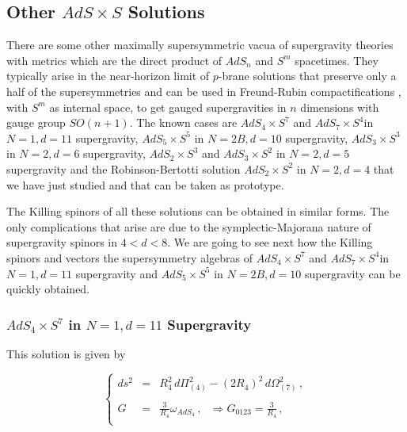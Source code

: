 \documentclass[12pt,a4paper]{article}
\begin{document}
\subsection{Other $AdS\times S$ Solutions}
\label{sec-AdSxS}

There are some other maximally supersymmetric vacua of supergravity
theories with metrics which are the direct product of $AdS_{n}$ and
$S^{m}$ spacetimes. They typically arise in the near-horizon limit of
$p$-brane solutions that preserve only a half of the supersymmetries
\cite{Gibbons:sv} and can be used in Freund-Rubin compactifications
\cite{Freund:1980xh}, with $S^{m}$ as internal space, to get gauged
supergravities in $n$ dimensions with gauge group $SO(n+1)$. The known
cases are $AdS_{4}\times S^{7}$ and $AdS_{7}\times S^{4}$in $N=1,d=11$
supergravity, $AdS_{5}\times S^{5}$ in $N=2B,d=10$ supergravity,
$AdS_{3}\times S^{3}$ in $N=2,d=6$ supergravity, $AdS_{2}\times S^{3}$
\cite{Chamseddine:1996pi} and $AdS_{3}\times S^{2}$
\cite{Gibbons:1994vm} in $N=2,d=5$ supergravity and the
Robinson-Bertotti solution $AdS_{2}\times S^{2}$ in $N=2,d=4$ that we
have just studied and that can be taken as prototype.

The Killing spinors of all these solutions can be obtained in similar
forms. The only complications that arise are due to the
symplectic-Majorana nature of supergravity spinors in $4<d<8$.  We are
going to see next how the Killing spinors and vectors the
supersymmetry algebras of $AdS_{4}\times S^{7}$ and $AdS_{7}\times
S^{4}$in $N=1,d=11$ supergravity and $AdS_{5}\times S^{5}$ in
$N=2B,d=10$ supergravity can be quickly obtained.


\subsubsection{$AdS_{4}\times S^{7}$ in $N=1,d=11$ Supergravity}

This solution is given by

\begin{equation}
\label{eq:ads4xs7}
\left\{
  \begin{array}{rcl}
ds^{2} & = & R_{4}^{2}\,  d\Pi_{(4)}^{2} 
-(2R_{4})^{2}\, d\Omega_{(7)}^{2}\, , \\
& & \\
G & = & \frac{3}{R_{4}}\omega_{AdS_{4}}\, ,
\,\,\,\,
\Rightarrow 
G_{0123}=\frac{3}{R_{4}}\, ,\\
  \end{array}
\right.
\end{equation}
\end{document}
